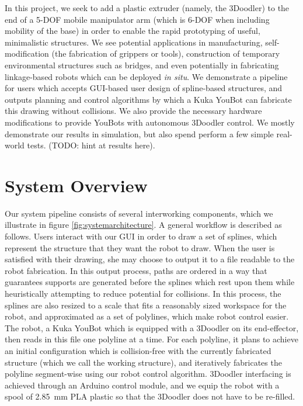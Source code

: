 \documentclass[conference]{acmsiggraph}
\begin{document}
In this project, we seek to add a plastic extruder (namely, the 3Doodler) to the end of a 5-DOF mobile manipulator arm (which is 6-DOF when including mobility of the base) in order to enable the rapid prototyping of useful, minimalistic structures.  We see potential applications in manufacturing, self-modification (the fabrication of grippers or tools), construction of temporary environmental structures such as bridges, and even potentially in fabricating linkage-based robots which can be deployed \emph{in situ}.  We demonstrate a pipeline for users which accepts GUI-based user design of spline-based structures, and outputs planning and control algorithms by which a Kuka YouBot can fabricate this drawing without collisions.  We also provide the necessary hardware modifications to provide YouBots with autonomous 3Doodler control.  We mostly demonstrate our results in simulation, but also spend perform a few simple real-world tests. (TODO: hint at results here).

\section{System Overview}
Our system pipeline consists of several interworking components, which we illustrate in figure \ref{fig:systemarchitecture}.  A general workflow is described as follows.  Users interact with our GUI in order to draw a set of splines, which represent the structure that they want the robot to draw.  When the user is satisfied with their drawing, she may choose to output it to a file readable to the robot fabrication.  In this output process, paths are ordered in a way that guarantees supports are generated before the splines which rest upon them while heuristically attempting to reduce potential for collisions.  In this process, the splines are also resized to a scale that fits a reasonably sized workspace for the robot, and approximated as a set of polylines, which make robot control easier.  The robot, a Kuka YouBot \cite{YouBot} which is equipped with a 3Doodler on its end-effector, then reads in this file one polyline at a time.  For each polyline, it plans to achieve an initial configuration which is collision-free with the currently fabricated structure (which we call the working structure), and iteratively fabricates the polyline segment-wise using our robot control algorithm.  3Doodler interfacing is achieved through an Arduino control module, and we equip the robot with a spool of 2.85~mm PLA plastic so that the 3Doodler does not have to be re-filled.
\end{document}

